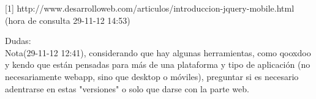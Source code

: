 [1] http://www.desarrolloweb.com/articulos/introduccion-jquery-mobile.html (hora de consulta 29-11-12 14:53)


Dudas:
\\
Nota(29-11-12 12:41), considerando que hay algunas herramientas, como qooxdoo y kendo que están
pensadas para más de una plataforma y tipo de aplicación (no necesariamente webapp, sino que desktop
o móviles), preguntar si es necesario adentrarse en estas "versiones" o solo que darse con la parte web.
